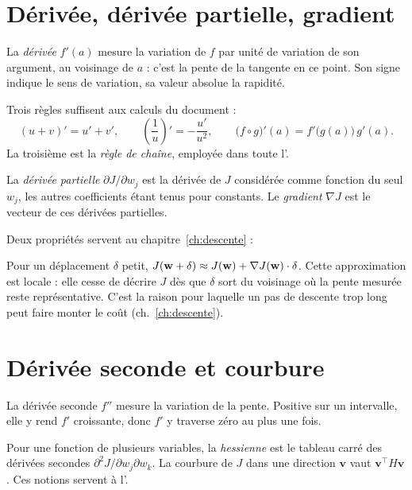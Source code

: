 \section{Dérivée, dérivée partielle, gradient}

La \emph{dérivée} $f'(a)$ mesure la variation de $f$ par unité de variation de
son argument, au voisinage de $a$ : c'est la pente de la tangente en ce point.
Son signe indique le sens de variation, sa valeur absolue la rapidité.

Trois règles suffisent aux calculs du document :
\[
  (u+v)'=u'+v',\qquad
  \left(\frac{1}{u}\right)'=-\frac{u'}{u^{2}},\qquad
  \bigl(f\circ g\bigr)'(a)=f'\bigl(g(a)\bigr)\,g'(a) .
\]
La troisième est la \emph{règle de chaîne}, employée dans toute
l'.

La \emph{dérivée partielle} $\partial J/\partial w_j$ est la dérivée de $J$
considérée comme fonction du seul $w_j$, les autres coefficients étant tenus
pour constants. Le \emph{gradient} $\nabla J$ est le vecteur de ces dérivées
partielles.

Deux propriétés servent au chapitre~\ref{ch:descente} :

\begin{panelitemize}[rulecolor]
\end{panelitemize}

\begin{rappel}
Pour un déplacement $\delta$ petit,
$J(\mathbf{w}+\delta)\approx J(\mathbf{w})+\nabla J(\mathbf{w})\cdot\delta$. Cette approximation est
locale : elle cesse de décrire $J$ dès que $\delta$ sort du voisinage où la
pente mesurée reste représentative. C'est la raison pour laquelle un pas de
descente trop long peut faire monter le coût
(ch.~\ref{ch:descente}).
\end{rappel}

\section{Dérivée seconde et courbure}

La dérivée seconde $f''$ mesure la variation de la pente. Positive sur un
intervalle, elle y rend $f'$ croissante, donc $f'$ y traverse zéro au plus une
fois.

Pour une fonction de plusieurs variables, la \emph{hessienne} est le tableau
carré des dérivées secondes $\partial^2 J/\partial w_j\partial w_k$. La courbure
de $J$ dans une direction $\mathbf v$ vaut $\mathbf v^{\!\top}H\mathbf v$. Ces
notions servent à l'.
